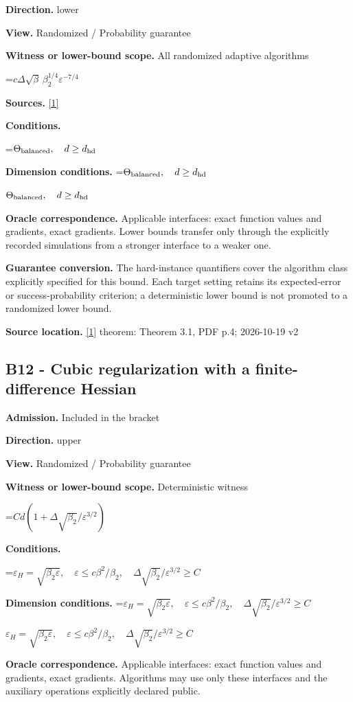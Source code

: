 \documentclass[10pt,a4paper]{article}
\newcommand{\AtlasMath}[1]{\par\begingroup\centering\setbox0=\hbox{$\displaystyle #1$}\ifdim\wd0>1.4\linewidth\typeout{ATLAS WIDE FORMULA: \the\wd0}\fi\ifdim\wd0>\linewidth\resizebox{\linewidth}{!}{\box0}\else\box0\fi\par\endgroup}
\newcommand{\AtlasInlineMath}[1]{\begingroup\setbox0=\hbox{$#1$}\ifdim\wd0>.4\linewidth\endgroup\AtlasMath{#1}\else\endgroup$#1$\fi}
\begin{document}
\textbf{Direction.} lower

\textbf{View.} Randomized / Probability guarantee

\textbf{Witness or lower-bound scope.} All randomized adaptive algorithms

\AtlasMath{c\Delta\sqrt\beta\,\beta_2^{1/4}\varepsilon^{-7/4}}
\textbf{Sources.} \href{https://arxiv.org/pdf/2610.00245v2}{[1]}

\textbf{Conditions.} 
\AtlasMath{\Theta_{\rm balanced},\quad d\ge d_{\rm hd}}


\textbf{Dimension conditions.} \AtlasInlineMath{\Theta_{\rm balanced},\quad d\ge d_{\rm hd}}

\textbf{Oracle correspondence.} Applicable interfaces: exact function values and gradients, exact gradients. Lower bounds transfer only through the explicitly recorded simulations from a stronger interface to a weaker one.

\textbf{Guarantee conversion.} The hard-instance quantifiers cover the algorithm class explicitly specified for this bound. Each target setting retains its expected-error or success-probability criterion; a deterministic lower bound is not promoted to a randomized lower bound.

\textbf{Source location.} \href{https://arxiv.org/pdf/2610.00245v2}{[1]} theorem: Theorem 3.1, PDF p.4; 2026-10-19 v2

\subsection{B12 - Cubic regularization with a finite-difference Hessian}
\textbf{Admission.} Included in the bracket

\textbf{Direction.} upper

\textbf{View.} Randomized / Probability guarantee

\textbf{Witness or lower-bound scope.} Deterministic witness

\AtlasMath{Cd(1+\Delta\sqrt{\beta_2}/\varepsilon^{3/2})}
\textbf{Conditions.} 
\AtlasMath{\varepsilon_H=\sqrt{\beta_2\varepsilon},\quad\varepsilon\le c\beta^2/\beta_2,\quad\Delta\sqrt{\beta_2}/\varepsilon^{3/2}\ge C}


\textbf{Dimension conditions.} \AtlasInlineMath{\varepsilon_H=\sqrt{\beta_2\varepsilon},\quad\varepsilon\le c\beta^2/\beta_2,\quad\Delta\sqrt{\beta_2}/\varepsilon^{3/2}\ge C}

\textbf{Oracle correspondence.} Applicable interfaces: exact function values and gradients, exact gradients. Algorithms may use only these interfaces and the auxiliary operations explicitly declared public.
\end{document}
